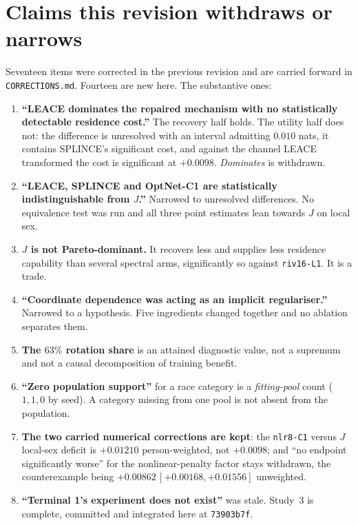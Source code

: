 \documentclass[10pt]{article}
\begin{document}
\section{Claims this revision withdraws or narrows}
\label{sec:withdrawn}

Seventeen items were corrected in the previous revision and are carried forward in
\texttt{CORRECTIONS.md}. Fourteen are new here. The substantive ones:

\begin{enumerate}\itemsep1pt
\item \textbf{``LEACE dominates the repaired mechanism with no statistically detectable residence
cost.''} The recovery half holds. The utility half does not: the difference is unresolved with an
interval admitting $0.010$ nats, it contains SPLINCE's significant cost, and against the channel LEACE
transformed the cost is significant at $+0.0098$. \emph{Dominates} is withdrawn.
\item \textbf{``LEACE, SPLINCE and OptNet-C1 are statistically indistinguishable from $J$.''} Narrowed
to unresolved differences. No equivalence test was run and all three point estimates lean towards $J$
on local sex.
\item \textbf{$J$ is not Pareto-dominant.} It recovers less and supplies less residence capability
than several spectral arms, significantly so against \texttt{riv16-L1}. It is a trade.
\item \textbf{``Coordinate dependence was acting as an implicit regulariser.''} Narrowed to a
hypothesis. Five ingredients changed together and no ablation separates them.
\item \textbf{The $63\%$ rotation share} is an attained diagnostic value, not a supremum and not a
causal decomposition of training benefit.
\item \textbf{``Zero population support''} for a race category is a \emph{fitting-pool} count
($1,1,0$ by seed). A category missing from one pool is not absent from the population.
\item \textbf{The two carried numerical corrections are kept}: the \texttt{nlr8-C1} versus $J$ local-sex
deficit is $+0.01210$ person-weighted, not $+0.0098$; and ``no endpoint significantly worse'' for the
nonlinear-penalty factor stays withdrawn, the counterexample being $+0.00862\,[+0.00168,+0.01556]$
unweighted.
\item \textbf{``Terminal 1's experiment does not exist''} was stale. Study~3 is complete, committed
and integrated here at \texttt{73903b7f}.
\end{enumerate}
\end{document}
